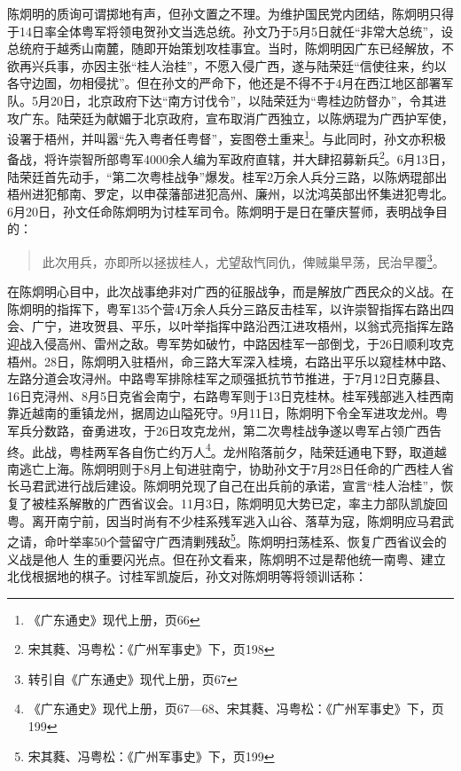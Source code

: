 陈炯明的质询可谓掷地有声，但孙文置之不理。为维护国民党内团结，陈炯明只得于14日率全体粤军将领电贺孙文当选总统。孙文乃于5月5日就任“非常大总统”，设总统府于越秀山南麓，随即开始策划攻桂事宜。当时，陈炯明因广东已经解放，不欲再兴兵事，亦因主张“桂人治桂”，不愿入侵广西，遂与陆荣廷“信使往来，约以各守边圄，勿相侵扰”。但在孙文的严命下，他还是不得不于4月在西江地区部署军队。5月20日，北京政府下达“南方讨伐令”，以陆荣廷为“粤桂边防督办”，令其进攻广东。陆荣廷为献媚于北京政府，宣布取消广西独立，以陈炳琨为广西护军使，设署于梧州，并叫嚣“先入粤者任粤督”，妄图卷土重来\footnote{《广东通史》现代上册，页66}。与此同时，孙文亦积极备战，将许崇智所部粤军4000余人编为军政府直辖，并大肆招募新兵\footnote{宋其蕤、冯粤松：《广州军事史》下，页198}。6月13日，陆荣廷首先动手，“第二次粤桂战争”爆发。桂军2万余人兵分三路，以陈炳琨部出梧州进犯郁南、罗定，以申葆藩部进犯高州、廉州，以沈鸿英部出怀集进犯粤北。6月20日，孙文任命陈炯明为讨桂军司令。陈炯明于是日在肇庆誓师，表明战争目的：


\begin{quote}
此次用兵，亦即所以拯拔桂人，尤望敌忾同仇，俾贼巢早荡，民治早覆\footnote{转引自《广东通史》现代上册，页67}。
\end{quote}

在陈炯明心目中，此次战事绝非对广西的征服战争，而是解放广西民众的义战。在陈炯明的指挥下，粤军135个营4万余人兵分三路反击桂军，以许崇智指挥右路出四会、广宁，进攻贺县、平乐，以叶举指挥中路沿西江进攻梧州，以翁式亮指挥左路迎战入侵高州、雷州之敌。粤军势如破竹，中路因桂军一部倒戈，于26日顺利攻克梧州。28日，陈炯明入驻梧州，命三路大军深入桂境，右路出平乐以窥桂林中路、左路分道会攻浔州。中路粤军排除桂军之顽强抵抗节节推进，于7月12日克藤县、16日克浔州、8月5日克省会南宁，右路粤军则于13日克桂林。桂军残部逃入桂西南靠近越南的重镇龙州，据周边山隘死守。9月11日，陈炯明下令全军进攻龙州。粤军兵分数路，奋勇进攻，于26日攻克龙州，第二次粤桂战争遂以粤军占领广西告终。此战，粤桂两军各自伤亡约万人\footnote{《广东通史》现代上册，页67—68、宋其蕤、冯粤松：《广州军事史》下，页199}。龙州陷落前夕，陆荣廷通电下野，取道越南逃亡上海。陈炯明则于8月上旬进驻南宁，协助孙文于7月28日任命的广西桂人省长马君武进行战后建设。陈炯明兑现了自己在出兵前的承诺，宣言“桂人治桂”，恢复了被桂系解散的广西省议会。11月3日，陈炯明见大势已定，率主力部队凯旋回粤。离开南宁前，因当时尚有不少桂系残军逃入山谷、落草为寇，陈炯明应马君武之请，命叶举率50个营留守广西清剿残敌\footnote{宋其蕤、冯粤松：《广州军事史》下，页199}。陈炯明扫荡桂系、恢复广西省议会的义战是他人 生的重要闪光点。但在孙文看来，陈炯明不过是帮他统一南粤、建立北伐根据地的棋子。讨桂军凯旋后，孙文对陈炯明等将领训话称：


